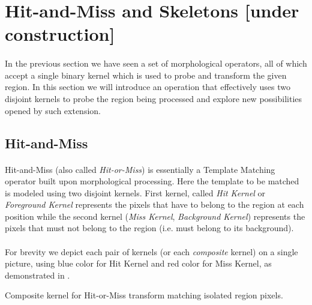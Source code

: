 \section{Hit-and-Miss and Skeletons [under construction]}

\paragraph*{}
In the previous section we have seen a set of morphological operators, all of which accept a single binary kernel which is used to probe and transform the given region. In this section we will introduce an operation that effectively uses two disjoint kernels to probe the region being processed and explore new possibilities opened by such extension.

\subsection{Hit-and-Miss}

\paragraph*{}
Hit-and-Miss (also called \textit{Hit-or-Miss}) is essentially a Template Matching operator built upon morphological processing. Here the template to be matched is modeled using two disjoint kernels. First kernel, called \textit{Hit Kernel} or \textit{Foreground Kernel} represents the pixels that have to belong to the region at each position while the second kernel (\textit{Miss Kernel}, \textit{Background Kernel}) represents the pixels that must not belong to the region (i.e. must belong to its background).

\paragraph*{}
For brevity we depict each pair of kernels (or each \textit{composite} kernel) on a single picture, using blue color for Hit Kernel and red color for Miss Kernel, as demonstrated in .


\newarray\compositeKernel
{}


\begin{table}[h!]
\centering
{}


\endtabular
\caption{Composite kernel for Hit-or-Miss transform matching isolated region pixels.}
\label{tab:CompositeKernel}
\end{table}

